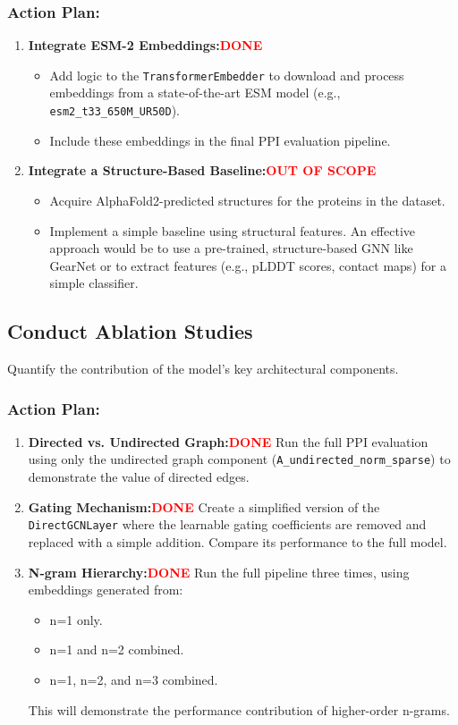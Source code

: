 \documentclass[11pt, a4paper]{article}
\begin{document}
	\subsubsection*{Action Plan:}
	\begin{enumerate}
		\item \textbf{Integrate ESM-2 Embeddings:\textcolor{red}{DONE}}
		\begin{itemize}
			\item Add logic to the \texttt{TransformerEmbedder} to download and process embeddings from a state-of-the-art ESM model (e.g., \texttt{esm2\_t33\_650M\_UR50D}).
			\item Include these embeddings in the final PPI evaluation pipeline.
		\end{itemize}
		\item \textbf{Integrate a Structure-Based Baseline:\textcolor{red}{OUT OF SCOPE}}
		\begin{itemize}
			\item Acquire AlphaFold2-predicted structures for the proteins in the dataset.
			\item Implement a simple baseline using structural features. An effective approach would be to use a pre-trained, structure-based GNN like GearNet or to extract features (e.g., pLDDT scores, contact maps) for a simple classifier.
		\end{itemize}
	\end{enumerate}
	
	\subsection{Conduct Ablation Studies}
	Quantify the contribution of the model's key architectural components.
	\subsubsection*{Action Plan:}
	\begin{enumerate}
		\item \textbf{Directed vs. Undirected Graph:\textcolor{red}{DONE}} Run the full PPI evaluation using only the undirected graph component (\texttt{A\_undirected\_norm\_sparse}) to demonstrate the value of directed edges.
		\item \textbf{Gating Mechanism:\textcolor{red}{DONE}} Create a simplified version of the \texttt{DirectGCNLayer} where the learnable gating coefficients are removed and replaced with a simple addition. Compare its performance to the full model.
		\item \textbf{N-gram Hierarchy:\textcolor{red}{DONE}} Run the full pipeline three times, using embeddings generated from:
		\begin{itemize}
			\item n=1 only.
			\item n=1 and n=2 combined.
			\item n=1, n=2, and n=3 combined.
		\end{itemize}
		This will demonstrate the performance contribution of higher-order n-grams.
	\end{enumerate}
	
\end{document}

